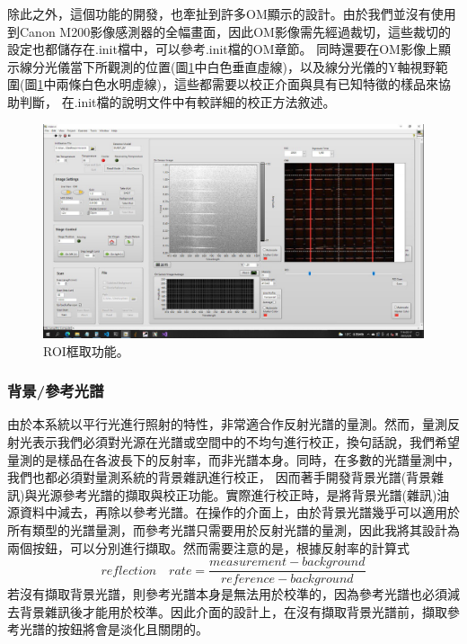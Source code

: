 \documentclass[12pt]{article}
\begin{document}
    除此之外，這個功能的開發，也牽扯到許多OM顯示的設計。由於我們並沒有使用到Canon M200影像感測器的全幅畫面，因此OM影像需先經過裁切，這些裁切的設定也都儲存在.init檔中，可以參考.init檔的OM章節。
    同時還要在OM影像上顯示線分光儀當下所觀測的位置(圖\ref{figure: roi}中白色垂直虛線)，以及線分光儀的Y軸視野範圍(圖\ref{figure: roi}中兩條白色水明虛線)，這些都需要以校正介面與具有已知特徵的樣品來協助判斷，
    在.init檔的說明文件中有較詳細的校正方法敘述。
    \begin{figure}
        \centering
        \includegraphics[width=\linewidth]{roi.jpeg}
        \caption{ROI框取功能。}
        \label{figure: roi}
    \end{figure}

    \subsubsection{背景/參考光譜}
    由於本系統以平行光進行照射的特性，非常適合作反射光譜的量測。然而，量測反射光表示我們必須對光源在光譜或空間中的不均勻進行校正，換句話說，我們希望量測的是樣品在各波長下的反射率，而非光譜本身。同時，在多數的光譜量測中，我們也都必須對量測系統的背景雜訊進行校正，
    因而著手開發背景光譜(背景雜訊)與光源參考光譜的擷取與校正功能。實際進行校正時，是將背景光譜(雜訊)油源資料中減去，再除以參考光譜。在操作的介面上，由於背景光譜幾乎可以適用於所有類型的光譜量測，而參考光譜只需要用於反射光譜的量測，因此我將其設計為兩個按鈕，可以分別進行擷取。然而需要注意的是，根據反射率的計算式
    \begin{equation}\label{equation: reflection}
        reflection \quad rate=\frac{measurement-background}{reference-background}
    \end{equation}
    若沒有擷取背景光譜，則參考光譜本身是無法用於校準的，因為參考光譜也必須減去背景雜訊後才能用於校準。因此介面的設計上，在沒有擷取背景光譜前，擷取參考光譜的按鈕將會是淡化且關閉的。
\end{document}
